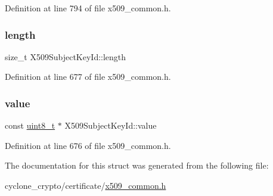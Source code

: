 Definition at line 794 of file x509\+\_\+common.\+h.

\mbox{\label{structX509SubjectKeyId_ae72259e33329d3224c90547e63f95804}} 
\subsubsection{\texorpdfstring{length}{length}}
{\footnotesize\ttfamily size\+\_\+t X509\+Subject\+Key\+Id\+::length}



Definition at line 677 of file x509\+\_\+common.\+h.

\mbox{\label{structX509SubjectKeyId_ac13791883d5af3098c8fcecd596f4737}} 
\subsubsection{\texorpdfstring{value}{value}}
{\footnotesize\ttfamily const \hyperlink{stdint_8h_aba7bc1797add20fe3efdf37ced1182c5}{uint8\+\_\+t} $\ast$ X509\+Subject\+Key\+Id\+::value}



Definition at line 676 of file x509\+\_\+common.\+h.



The documentation for this struct was generated from the following file\+:\begin{DoxyCompactItemize}
\item 
cyclone\+\_\+crypto/certificate/\hyperlink{certificate_2x509__common_8h}{x509\+\_\+common.\+h}\end{DoxyCompactItemize}
